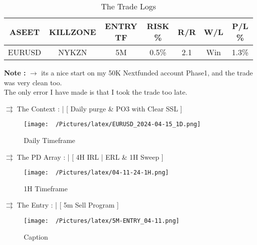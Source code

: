 \documentclass{article}
\begin{document}
\begin{center}
\begin{table}[h!]
\caption{The Trade Logs}
\label{tab:my_label}
  \vspace{0.3cm}
\begin{tabular}{|c|c|c|c|c|c|c|}
\toprule
  \textbf{ASEET} & \textbf{KILLZONE} & \textbf{ENTRY TF}  & \textbf{RISK \%} & \textbf{R/R} & \textbf{W/L} & \textbf{P/L \%} \\
\midrule
  EURUSD & NYKZN & 5M & 0.5\% & 2.1 & Win & 1.3\% \\
\bottomrule
\end{tabular}
\end{table}
\end{center}


\begin{center}
\begin{mdframed}[style=MyQuoteFrame]
\textbf{Note :} $\rightarrow$ its a nice start on my 50K Nextfunded account Phase1, and the trade was very clean too. \\ 
The only error I have made is that I took the trade too late.
\end{mdframed}
\end{center}
\vspace{0.2cm}

\newpage

\noindent \( \rightrightarrows \) \hspace{0.1cm}The Context : | [ Daily purge \& PO3 with Clear SSL ] 
\begin{figure}[h!]
  \begin{adjustbox}{width=1.1\textwidth,center}
  \texttt{[image: ~/Pictures/latex/EURUSD\_2024-04-15\_1D.png]}
\end{adjustbox}
\caption{Daily Timeframe}
\label{fig:image}
\end{figure}


\noindent \( \rightrightarrows \) \hspace{0.1cm}The PD Array : | [ 4H IRL | ERL \& 1H Sweep ]
\begin{figure}[h!]
  \begin{adjustbox}{width=1.1\textwidth,center}
  \texttt{[image: ~/Pictures/latex/04-11-24-1H.png]}
\end{adjustbox}
\caption{1H Timeframe}
\label{fig:image}
\end{figure}

\newpage

\noindent \( \rightrightarrows \) \hspace{0.1cm}The Entry : | [ 5m Sell Program ]
\begin{figure}[h!]
  \begin{adjustbox}{width=1.2\textwidth,center}
  \texttt{[image: ~/Pictures/latex/5M-ENTRY\_04-11.png]}
\end{adjustbox}
\caption{Caption}
\label{fig:image}
\end{figure}
\end{document}
